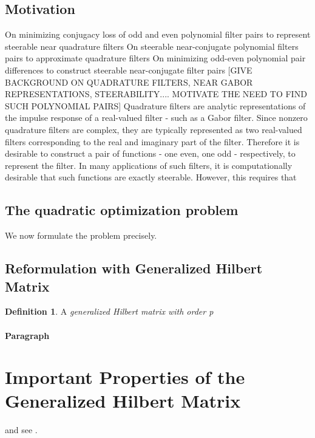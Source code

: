 \documentclass{article}
\theoremstyle{definition}
\newtheorem{defn}[thm]{Definition}
\theoremstyle{remark}
\numberwithin{equation}{section}
\begin{document}
\subsection{Motivation}
On minimizing conjugacy loss of odd and even polynomial filter pairs to represent steerable near quadrature filters
On steerable near-conjugate polynomial filters pairs to approximate quadrature filters
On minimizing odd-even polynomial pair differences to construct steerable near-conjugate filter pairs
[GIVE BACKGROUND ON QUADRATURE FILTERS, NEAR GABOR REPRESENTATIONS, STEERABILITY.... MOTIVATE THE NEED TO FIND SUCH POLYNOMIAL PAIRS]
Quadrature filters are analytic representations of the impulse response of a real-valued filter - such as a Gabor filter. Since nonzero quadrature filters are complex, they are typically represented as two real-valued filters corresponding to the real and imaginary part of the filter. Therefore it is desirable to construct a pair of functions - one even, one odd - respectively, to represent the filter. In many applications of such filters, it is computationally desirable that such functions are exactly steerable. However, this requires that 

\subsection{The quadratic optimization problem}
\label{problem}

We now formulate the problem precisely. 

\subsection{Reformulation with Generalized Hilbert Matrix}
\label{reformulation-hilbert}
\begin{defn}\label{generalized-hilbert-matrix}
A \emph{generalized Hilbert matrix with order p} 
\end{defn}

\paragraph{Paragraph}
\lipsum[7]
\section{Important Properties of the Generalized Hilbert Matrix}

\label{sec:others}
\lipsum[8] \cite{kour2014real,kour2014fast} and see \cite{hadash2018estimate}.
\end{document}
